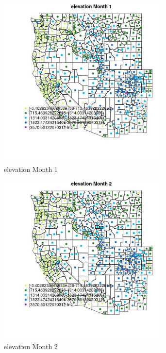 \begin{figure} 
\centering  
\includegraphics[width=0.77\textwidth]{Code_Outputs/df_report_ML_predictors_CountyCentroid_Locations_Dates_2008-01-01to2018-12-31_MapObsMo1elevation.jpg} 
\caption{\label{fig:df_report_ML_predictors_CountyCentroid_Locations_Dates_2008-01-01to2018-12-31MapObsMo1elevation}elevation Month 1} 
\end{figure} 
 

\begin{figure} 
\centering  
\includegraphics[width=0.77\textwidth]{Code_Outputs/df_report_ML_predictors_CountyCentroid_Locations_Dates_2008-01-01to2018-12-31_MapObsMo2elevation.jpg} 
\caption{\label{fig:df_report_ML_predictors_CountyCentroid_Locations_Dates_2008-01-01to2018-12-31MapObsMo2elevation}elevation Month 2} 
\end{figure} 
 


